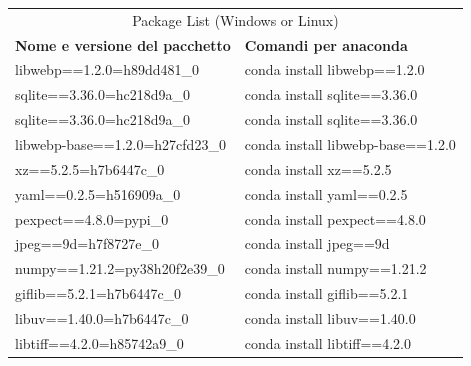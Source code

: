 \newpage



\begin{table}
\begin{tabular}{ |p{8cm}||p{8cm}|  }




\multicolumn{2}{|c|}{Package List (Windows or Linux)} \\


\textbf{Nome e versione del pacchetto}& \textbf{Comandi per anaconda}\\


libwebp==1.2.0=h89dd481\_0&conda install libwebp==1.2.0  \\



sqlite==3.36.0=hc218d9a\_0&conda install sqlite==3.36.0\\



  sqlite==3.36.0=hc218d9a\_0&	conda install sqlite==3.36.0\\


libwebp-base==1.2.0=h27cfd23\_0&conda install libwebp-base==1.2.0\\


  xz==5.2.5=h7b6447c\_0&	conda install xz==5.2.5\\


  yaml==0.2.5=h516909a\_0&	conda install yaml==0.2.5\\


  pexpect==4.8.0=pypi\_0&	conda install pexpect==4.8.0\\



  jpeg==9d=h7f8727e\_0&	conda install jpeg==9d\\



  numpy==1.21.2=py38h20f2e39\_0&	conda install numpy==1.21.2\\




  giflib==5.2.1=h7b6447c\_0&conda install giflib==5.2.1\\



  libuv==1.40.0=h7b6447c\_0&	conda install libuv==1.40.0\\




  libtiff==4.2.0=h85742a9\_0&	conda install libtiff==4.2.0\\




\end{tabular}
\end{table}
